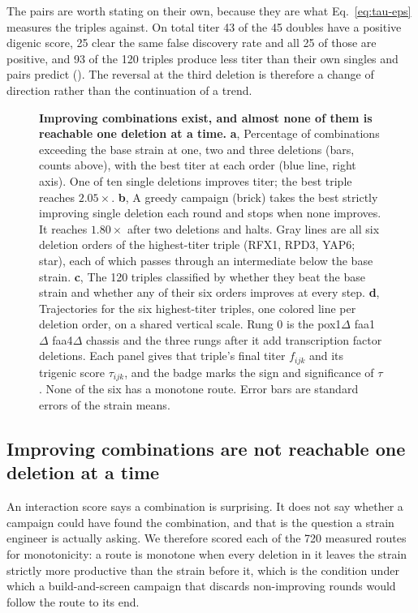 The pairs are worth stating on their own, because they are what
Eq.~\ref{eq:tau-eps} measures the triples against. On total titer 43 of the 45 doubles
have a positive digenic score, 25 clear the same false discovery rate and all 25 of those
are positive, and 93 of the 120 triples produce less titer than their own singles and pairs
predict (). The reversal at the third deletion is therefore a
change of direction rather than the continuation of a trend.

\begin{figure}[t]
\caption{\textbf{Improving combinations exist, and almost none of them is reachable one
deletion at a time.} \textbf{a}, Percentage of combinations exceeding the base strain at
one, two and three deletions (bars, counts above), with the best titer at each order (blue
line, right axis). One of ten single deletions improves titer; the best triple reaches
$2.05\times$. \textbf{b}, A greedy campaign (brick) takes the best strictly improving single
deletion each round and stops when none improves. It reaches $1.80\times$ after two
deletions and halts. Gray lines are all six deletion orders of the highest-titer triple
(RFX1, RPD3, YAP6; star), each of which passes through an intermediate below the base
strain. \textbf{c}, The 120 triples classified by whether they beat the base strain and
whether any of their six orders improves at every step. \textbf{d}, Trajectories for the
six highest-titer triples, one colored line per deletion order, on a shared vertical scale.
Rung 0 is the pox1$\Delta$ faa1$\Delta$ faa4$\Delta$ chassis and the three rungs after it
add transcription factor deletions. Each panel gives that triple's final titer $f_{ijk}$ and
its trigenic score $\tau_{ijk}$, and the badge marks the sign and significance of $\tau$.
None of the six has a monotone route. Error bars are standard errors of the strain means.}
\label{fig:inaccessible}
\end{figure}

\FloatBarrier
\subsection*{Improving combinations are not reachable one deletion at a time}

An interaction score says a combination is surprising. It does not say whether a campaign
could have found the combination, and that is the question a strain engineer is actually
asking. We therefore scored each of the 720 measured routes for monotonicity: a route is
monotone when every deletion in it leaves the strain strictly more productive than the
strain before it, which is the condition under which a build-and-screen campaign that discards
non-improving rounds would follow the route to its end.

